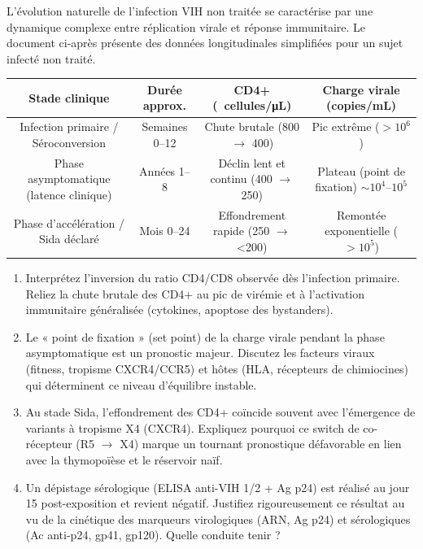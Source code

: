 \documentclass[11pt]{article}
\begin{document}
\begin{exercice}
L'évolution naturelle de l'infection VIH non traitée se caractérise par une dynamique complexe entre réplication virale et réponse immunitaire. Le document ci-après présente des données longitudinales simplifiées pour un sujet infecté non traité.

\begin{center}
\begin{tabular}{|c|c|c|c|}
\hline
\textbf{Stade clinique} & \textbf{Durée approx.} & \textbf{CD4+ (\SI{}{cellules/\micro\liter})} & \textbf{Charge virale (copies/mL)} \\
\hline
Infection primaire / Séroconversion & Semaines 0--12 & Chute brutale (800 $\to$ 400) & Pic extrême ($>10^6$) \\
\hline
Phase asymptomatique (latence clinique) & Années 1--8 & Déclin lent et continu (400 $\to$ 250) & Plateau (point de fixation) $\sim 10^4$--$10^5$ \\
\hline
Phase d'accélération / Sida déclaré & Mois 0--24 & Effondrement rapide (250 $\to$ \textless 200) & Remontée exponentielle ($>10^5$) \\
\hline
\end{tabular}
\end{center}

\begin{enumerate}
    \item Interprétez l'inversion du ratio CD4/CD8 observée dès l'infection primaire. Reliez la chute brutale des CD4+ au pic de virémie et à l'activation immunitaire généralisée (cytokines, apoptose des bystanders).
    \item Le « point de fixation » (set point) de la charge virale pendant la phase asymptomatique est un pronostic majeur. Discutez les facteurs viraux (fitness, tropisme CXCR4/CCR5) et hôtes (HLA, récepteurs de chimiocines) qui déterminent ce niveau d'équilibre instable.
    \item Au stade Sida, l'effondrement des CD4+ coïncide souvent avec l'émergence de variants à tropisme X4 (CXCR4). Expliquez pourquoi ce switch de co-récepteur (R5 $\to$ X4) marque un tournant pronostique défavorable en lien avec la thymopoïèse et le réservoir na\"if.
    \item Un dépistage sérologique (ELISA anti-VIH 1/2 + Ag p24) est réalisé au jour 15 post-exposition et revient négatif. Justifiez rigoureusement ce résultat au vu de la cinétique des marqueurs virologiques (ARN, Ag p24) et sérologiques (Ac anti-p24, gp41, gp120). Quelle conduite tenir ?
\end{enumerate}
\end{exercice}
\end{document}

